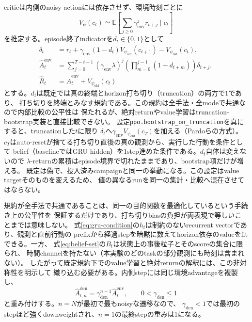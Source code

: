 \documentclass[a4paper,11pt]{article}
\newcommand{\old}{\mathrm{old}}
\newcommand{\env}{\mathrm{env}}
\newcommand{\den}{\mathrm{den}}
\begin{document}
criticは内側のnoisy actionには依存させず、環境時刻ごとに
\begin{equation}
  V_\psi(c_t)\simeq
  \mathbb E\!\left[\sum_{j\geq0}\gamma_{\env}^j r_{t+j}\mid c_t\right]
  \label{eq:critic}
\end{equation}
を推定する。episode終了indicatorを$d_t\in\{0,1\}$として
\begin{align}
  \delta_t
    &=r_t+\gamma_{\env}(1-d_t)V_{\psi_{\old}}(c_{t+1})
      -V_{\psi_{\old}}(c_t),\\
  \widehat A_t^{\env}
    &=\sum_{j=0}^{T-t-1}(\gamma_{\env}\lambda)^j
      \left(\prod_{m=0}^{j-1}(1-d_{t+m})\right)\delta_{t+j},\\
  \widehat R_t
    &=\widehat A_t^{\env}+V_{\psi_{\old}}(c_t)
  \label{eq:gae}
\end{align}
とする。$d_t$は既定では真の終端とhorizon打ち切り（truncation）の両方で$1$であり、
打ち切りを終端とみなす規約である。この規約は全手法・全modeで共通なので内部比較の公平性は
保たれるが、絶対returnやvalue学習はtruncation-bootstrap実装と直接比較できない。
設定\texttt{ppo.bootstrap\_on\_truncation}を真にすると、truncationした$t$に限り
$\delta_t$へ$\gamma_{\env}V_{\psi_{\old}}(c_T)$を加える（Pardoら\cite{pardo2018timelimits}の方式）。
$c_T$はauto-resetが捨てる打ち切り直後の真の観測から、実行した行動を条件として
belief（baselineではGRU hidden）を1step進めた条件である。$d_t$自体は変えないので
$\lambda$-returnの累積はepisode境界で切れたままであり、bootstrap項だけが増える。
既定は偽で、投入済みcampaignと同一の挙動になる。この設定はvalue targetそのものを変えるため、
値の異なるrunを同一の集計・比較へ混在させてはならない。

規約が全手法で共通であることは、同一の目的関数を最適化しているという手続き上の公平性を
保証するだけであり、打ち切りbiasの負担が両表現で等しいことまでは意味しない。
式\eqref{eq:gru-condition}の$h_t$は制約のないrecurrent vectorであり、観測と直前行動の
prefixから経過stepを暗黙に数えてhorizon依存のvalueをfitできる。一方、
式\eqref{eq:belief-set}の$B_t$は状態上の事後粒子とそのscoreの集合に限られ、
時間channelを持たない（本実験のどのtaskの部分観測にも時刻は含まれない）。
したがって既定規約下でのvalue学習と絶対returnの解釈には、この非対称性を明示して
織り込む必要がある。内側stepには同じ環境advantageを複製し、
\begin{equation}
  \widehat A_{t,n}^{\den}
  =\gamma_{\den}^{n-1}\widehat A_t^{\env},
  \qquad 0<\gamma_{\den}\leq1
  \label{eq:denoise-advantage}
\end{equation}
と重み付けする。$n=N$が最初で最もnoisyな遷移なので、
$\gamma_{\den}<1$では最初のstepほど強くdownweightされ、$n=1$の最終stepの重みは1になる。
\end{document}

